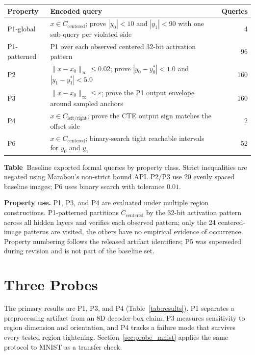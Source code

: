 \documentclass[twocolumn,smallextended,runningheads]{svjour3}
\newcommand{\sttttablefont}{\footnotesize}
\begin{document}
\begin{center}
\begin{minipage}{\columnwidth}
\sttttablefont
\setlength{\tabcolsep}{2pt}
\begin{tabular}{p{}p{}r}
\toprule
Property & Encoded query & Queries \\
\midrule
P1-global & $x \in C_\text{centered}$; prove $|y_0|<10$ and $|y_1|<90$ with one sub-query per violated side & 4 \\
P1-patterned & P1 over each observed centered 32-bit activation pattern & 96 \\
P2 & $\|x-x_0\|_\infty \le 0.02$; prove $|y_0-y_0^*|<1.0$ and $|y_1-y_1^*|<5.0$ & 160 \\
P3 & $\|x-x_0\|_\infty \le \varepsilon$; prove the P1 output envelope around sampled anchors & 160 \\
P4 & $x \in C_\text{left/right}$; prove the CTE output sign matches the offset side & 2 \\
P6 & $x \in C_\text{centered}$; binary-search tight reachable intervals for $y_0$ and $y_1$ & 52 \\
\bottomrule
\end{tabular}
\label{tab:specs}
\smallskip
\noindent\textbf{Table~\thetable}\quad Baseline exported formal queries by property class. Strict inequalities are negated using Marabou's non-strict bound API. P2/P3 use 20 evenly spaced baseline images; P6 uses binary search with tolerance $0.01$.
\end{minipage}
\end{center}

\textbf{Property use.} P1, P3, and P4 are evaluated under multiple region constructions. P1-patterned partitions $C_\text{centered}$ by the 32-bit activation pattern across all hidden layers and verifies each observed pattern; only the 24 centered-image patterns are visited, the others have no empirical evidence of occurrence. Property numbering follows the released artifact identifiers; P5 was superseded during revision and is not part of the baseline set.

\section{Three Probes}
\label{sec:probes}
\label{sec:results}

The primary results are P1, P3, and P4 (Table~\ref{tab:results}). P1 separates a preprocessing artifact from an 8D decoder-box claim, P3 measures sensitivity to region dimension and orientation, and P4 tracks a failure mode that survives every tested region tightening. Section~\ref{sec:probe_mnist} applies the same protocol to MNIST as a transfer check.
\end{document}

